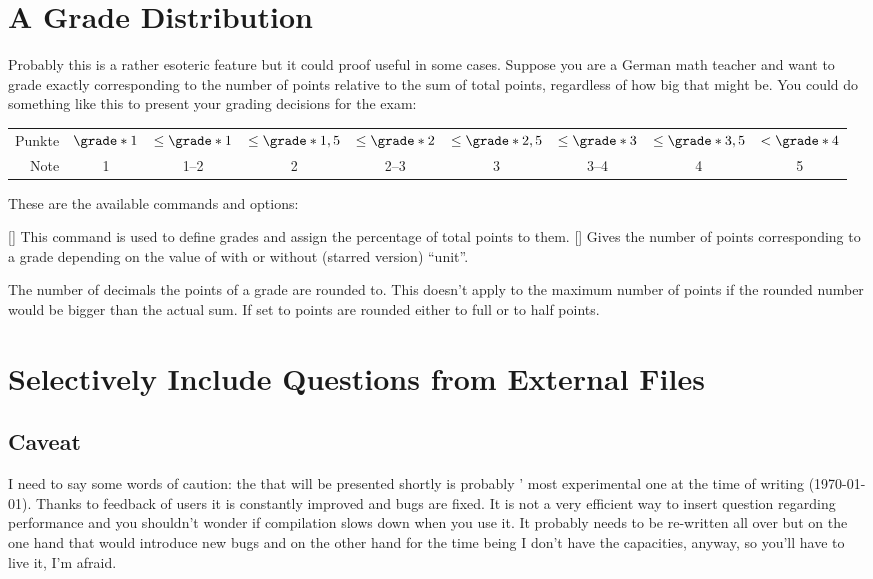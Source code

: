 \documentclass[load-preamble+,scrartcl={DIV10}]{cnltx-doc}
\begin{document}
\section{A Grade Distribution}
Probably this is a rather esoteric feature but it could proof useful in some
cases.  Suppose you are a German math teacher and want to grade exactly
corresponding to the number of points relative to the sum of total points,
regardless of how big that might be.  You could do something like this to
present your grading decisions for the exam:
\begin{example}
  \small\setlength\tabcolsep{2pt}
  \begin{tabular}{r|*8c}
    Punkte
    & $\grade*{1}$      & $\le\grade*{1}$ & $\le\grade*{1,5}$ & $\le\grade*{2}$
    & $\le\grade*{2,5}$ & $\le\grade*{3}$ & $\le\grade*{3,5}$ & $<\grade*{4}$ \\
    Note
    & 1 & 1--2 & 2 & 2--3 & 3 & 3--4 & 4 & 5
  \end{tabular}
\end{example}

These are the available commands and options:
\begin{commands}
  []
    This command is used to define grades and assign the percentage of total
    points to them.
  [\sarg{}]
    Gives the number of points corresponding to a grade depending on the value
    of  with or without (starred version) ``unit''.
\end{commands}
\begin{options}
    The number of decimals the points of a grade are rounded to.  This doesn't
    apply to the maximum number of points if the rounded number would be
    bigger than the actual sum.
    If set to  points are rounded either to full or to half
    points.
\end{options}

\section{Selectively Include Questions from External Files}\label{sec:include}
\subsection{Caveat}
I need to say some words of caution: the  that will be
presented shortly is probably \ExSheets' most experimental one at the time of
writing (\today).  Thanks to feedback of users it is constantly improved and
bugs are fixed.  It is not a very efficient way to insert question regarding
performance and you shouldn't wonder if compilation slows down when you use
it.  It probably needs to be re-written all over but on the one hand that
would introduce new bugs and on the other hand for the time being I don't have
the capacities, anyway, so you'll have to live it, I'm afraid.
\end{document}
